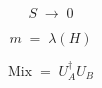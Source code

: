 \documentclass[12pt]{article}
\begin{document}
\[
S \;\to\; 0
\]

\[
m \;=\; \lambda(H)
\]

\[
\mathrm{Mix} \;=\; U_A^\dagger U_B
\]
\end{document}
